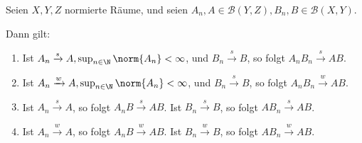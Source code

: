 \begin{exercise}

Seien $X, Y, Z$ normierte Räume, und seien $A_n, A \in \mathcal{B}(Y, Z), B_n, B \in \mathcal{B}(X, Y)$.

Dann gilt:

\begin{enumerate}[label = \alph*)]

  \item
  Ist $A_n \xrightarrow{s} A, \sup_{n \in \N} \norm{A_n} < \infty$, und $B_n \xrightarrow{s} B$, so folgt $A_n B_n \xrightarrow{s} A B$.

  \item
  Ist $A_n \xrightarrow{w} A, \sup_{n \in \N} \norm{A_n} < \infty$, und $B_n \xrightarrow{s} B$, so folgt $A_n B_n \xrightarrow{w} A B$.

  \item
  Ist $A_n \xrightarrow{s} A$, so folgt $A_n B \xrightarrow{s} A B$.
  Ist $B_n \xrightarrow{s} B$, so folgt $A B_n \xrightarrow{s} A B$.

  \item
  Ist $A_n \xrightarrow{w} A$, so folgt $A_n B \xrightarrow{w} A B$.
  Ist $B_n \xrightarrow{w} B$, so folgt $A B_n \xrightarrow{w} A B$.

\end{enumerate}

\end{exercise}


